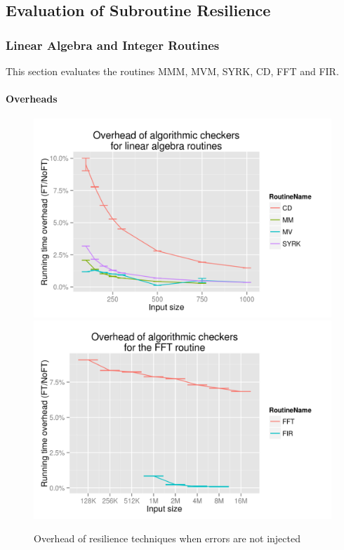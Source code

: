 \documentclass{sig-alternate}
\begin{document}
\subsection{Evaluation of Subroutine Resilience}
\label{sec:res_tech:eval}

\subsubsection{Linear Algebra and Integer Routines}
\label{sec:res_tech:eval:la_int}

This section evaluates the routines MMM, MVM, SYRK, CD, FFT and FIR.

\paragraph{Overheads}

\begin{figure}[ht!]
\centering
\includegraphics[width=1.00\columnwidth]{figs/4_1_1_Exp1_linalg}
\includegraphics[width=1.00\columnwidth]{figs/4_1_1_Exp1_fft}
\caption{Overhead of resilience techniques when errors are not injected}
\label{fig:routine_detect_ovhd}
\end{figure}
\end{document}
